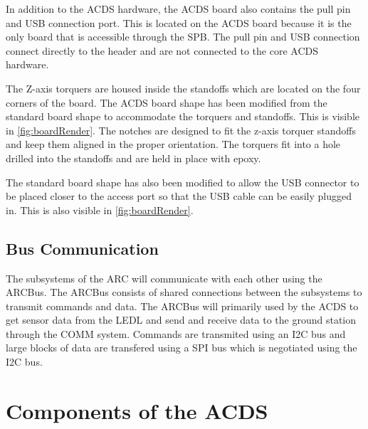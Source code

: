 In addition to the \ac{ACDS} hardware, the \ac{ACDS} board also contains the pull pin and \ac{USB} connection port. This is located on the \ac{ACDS} board because it is the only board that is accessible through the \ac{SPB}. The pull pin and \ac{USB} connection connect directly to the header and are not connected to the core \ac{ACDS} hardware. 

The Z-axis torquers are housed inside the standoffs which are located on the four corners of the board. The \ac{ACDS} board shape has been modified from the standard board shape to accommodate the torquers and standoffs. This is visible in \cref{fig:boardRender}. The notches are designed to fit the z-axis torquer standoffs and keep them aligned in the proper orientation. The torquers fit into a hole drilled into the standoffs and are held in place with epoxy. 

The standard board shape has also been modified to allow the \ac{USB} connector to be placed closer to the access port so that the \ac{USB} cable can be easily plugged in. This is also visible in \cref{fig:boardRender}.

\subsection{Bus Communication}

The subsystems of the \ac{ARC} will communicate with each other using the ARCBus. The ARCBus consists of shared connections between the subsystems to transmit commands and data. The ARCBus will primarily used by the \ac{ACDS} to get sensor data from the \ac{LEDL} and send and receive data to the ground station through the COMM system. Commands are transmited using an \ac{I2C} bus and large blocks of data are transfered using a \ac{SPI} bus which is negotiated using the \ac{I2C} bus.

\section{Components of the \acl{ACDS}}



